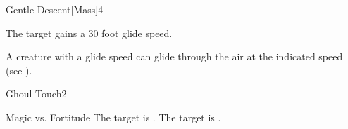 \begin{spellsection}{Gentle Descent}[Mass]{4}
    \begin{spellheader}
    \end{spellheader}
    \begin{spellcontent}
        \begin{spelltargetinginfo}
        \end{spelltargetinginfo}
        \begin{spelleffects}
            \spelleffect The target gains a 30 foot glide speed.
            \spelldur \durshort
        \end{spelleffects}
    \end{spellcontent}
    \begin{spellfooter}
        \spellnotes A creature with a glide speed can glide through the air at the indicated speed (see ).
        \miscastexplode
    \end{spellfooter}
\end{spellsection}

\begin{spellsection}{Ghoul Touch}{2}
    \begin{spellheader}
    \end{spellheader}
    \begin{spellcontent}
        \begin{spelltargetinginfo}
        \end{spelltargetinginfo}
        \begin{spelleffects}
            \begin{spellattack}{Magic vs. Fortitude}
                \spellsuccess The target is \staggered.
                \spellfailure The target is \sickened.
            \end{spellattack}
            \spelldur \durshort
        \end{spelleffects}
    \end{spellcontent}
    \begin{spellfooter}
        \miscastrandom
    \end{spellfooter}
\end{spellsection}


